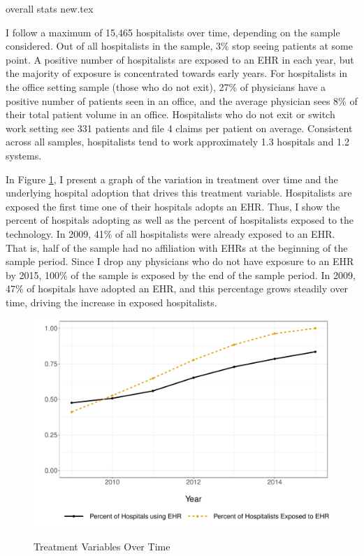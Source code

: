 \documentclass[12pt]{article}
\begin{document}
{overall stats new.tex}

\normalsize
I follow a maximum of 15,465 hospitalists over time, depending on the sample considered. Out of all hospitalists in the sample, 3\% stop seeing patients at some point. A positive number of hospitalists are exposed to an EHR in each year, but the majority of exposure is concentrated towards early years. For hospitalists in the office setting sample (those who do not exit), 27\% of physicians have a positive number of patients seen in an office, and the average physician sees 8\% of their total patient volume in an office. Hospitalists who do not exit or switch work setting see 331 patients and file 4 claims per patient on average. Consistent across all samples, hospitalists tend to work approximately 1.3 hospitals and 1.2 systems. 


In Figure \ref{fig:treatmentgraph}, I present a graph of the variation in treatment over time and the underlying hospital adoption that drives this treatment variable. Hospitalists are exposed the first time one of their hospitals adopts an EHR. Thus, I show the percent of hospitals adopting as well as the percent of hospitalists exposed to the technology. In 2009, 41\% of all hospitalists were already exposed to an EHR. That is, half of the sample had no affiliation with EHRs at the beginning of the sample period. Since I drop any physicians who do not have exposure to an EHR by 2015, 100\% of the sample is exposed by the end of the sample period. In 2009, 47\% of hospitals have adopted an EHR, and this percentage grows steadily over time, driving the increase in exposed hospitalists. 

\begin{figure}[t]
\centering
\captionsetup{width=.45\linewidth}
    \caption{Treatment Variables Over Time}
    \includegraphics[scale=.6]{Objects/sum_stats_year.pdf}
    \label{fig:treatmentgraph}
\end{figure}
\end{document}
